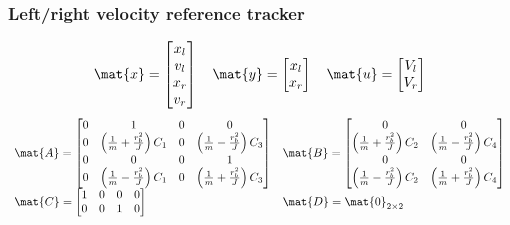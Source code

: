 \subsubsection{Left/right velocity reference tracker}
\begin{equation*}
  \mat{x} =
  \begin{bmatrix}
    x_l \\
    v_l \\
    x_r \\
    v_r
  \end{bmatrix}
  \quad
  \mat{y} =
  \begin{bmatrix}
    x_l \\
    x_r
  \end{bmatrix}
  \quad
  \mat{u} =
  \begin{bmatrix}
    V_l \\
    V_r
  \end{bmatrix}
\end{equation*}
\begin{equation*}
  \begin{array}{ll}
    \mat{A} =
    \begin{bmatrix}
      0 & 1 & 0 & 0 \\
      0 & \left(\frac{1}{m} + \frac{r_b^2}{J}\right) C_1 & 0 & \left(\frac{1}{m} - \frac{r_b^2}{J}\right) C_3 \\
      0 & 0 & 0 & 1 \\
      0 & \left(\frac{1}{m} - \frac{r_b^2}{J}\right) C_1 & 0 & \left(\frac{1}{m} + \frac{r_b^2}{J}\right) C_3
    \end{bmatrix} &
    \mat{B} =
    \begin{bmatrix}
      0 & 0 \\
      \left(\frac{1}{m} + \frac{r_b^2}{J}\right) C_2 & \left(\frac{1}{m} - \frac{r_b^2}{J}\right) C_4 \\
      0 & 0 \\
      \left(\frac{1}{m} - \frac{r_b^2}{J}\right) C_2 & \left(\frac{1}{m} + \frac{r_b^2}{J}\right) C_4
    \end{bmatrix} \\
    \mat{C} =
    \begin{bmatrix}
      1 & 0 & 0 & 0 \\
      0 & 0 & 1 & 0 \\
    \end{bmatrix} &
    \mat{D} = \mat{0}_{2 \times 2}
  \end{array}
\end{equation*}

